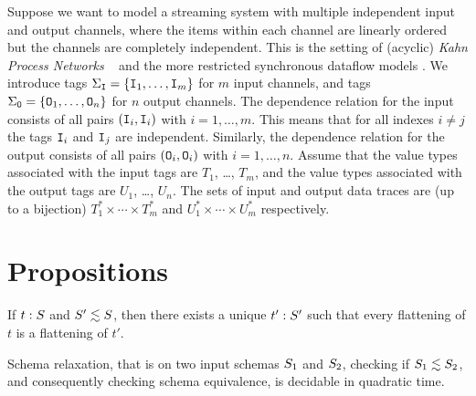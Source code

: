 
\begin{example}
\label{45:ex:channels}
Suppose we want to model a streaming system with multiple independent input and output channels, where the items within each channel are linearly ordered but the channels are completely independent. This is the setting of (acyclic) \emph{Kahn Process Networks} ~\cite{gilles1974semantics} and the more restricted synchronous dataflow models \cite{lee1987synchronous, benveniste2003synchronous}. We introduce tags $\Sigma_\tg{I} = \{ \tg{I}_1, \ldots, \tg{I}_m \}$ for $m$ input channels, and tags $\Sigma_\tg{O} = \{ \tg{O}_1, \ldots, \tg{O}_n \}$ for $n$ output channels.
The dependence relation for the input consists of all pairs $(\tg{I}_i,\tg{I}_i)$ with $i = 1, \ldots, m$. This means that for all indexes $i \neq j$ the tags $\tg{I}_i$ and $\tg{I}_j$ are independent. Similarly, the dependence relation for the output consists of all pairs $(\tg{O}_i,\tg{O}_i)$ with $i = 1, \ldots, n$. Assume that the value types associated with the input tags are $T_1$, \ldots, $T_m$, and the value types associated with the output tags are $U_1$, \ldots, $U_n$. The sets of input and output data traces are (up to a bijection) $T^*_1 \times \cdots \times T^*_m$ and $U^*_1 \times \cdots \times U^*_m$ respectively.
\end{example}

\section{Propositions}

\begin{proposition}
\label{45:prop:schema-relaxation-flattening}
If $t: \ss$ and $\ss' \lesssim \ss$,
then there exists a unique $t': \ss'$ such that
every flattening of $t$ is a flattening of $t'$.
\end{proposition}

\begin{proposition}
\label{45:prop:schema-relaxation-decidable}
Schema relaxation, that is on two input schemas $\ss_1$ and $\ss_2$, checking if $\ss_1 \lesssim \ss_2$, and consequently checking schema equivalence, is decidable in quadratic time.
\end{proposition}

